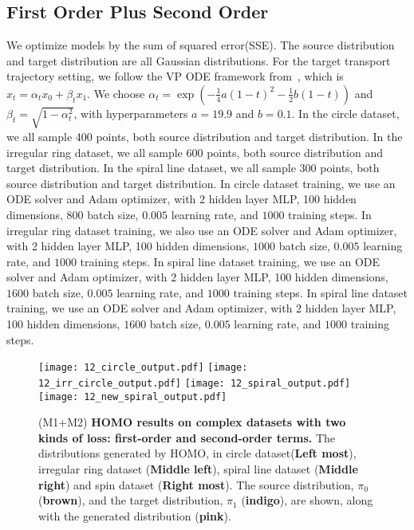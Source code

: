 \subsection{First Order Plus Second Order}\label{sec:app:first_second}
We optimize models by the sum of squared error(SSE). The source distribution and target distribution are all Gaussian distributions. For the target transport trajectory setting, we follow the VP ODE framework from~\cite{rectified_flow}, which is $x_t = \alpha_t x_0 + \beta_t x_1$. We choose $\alpha_t = \exp(-\frac{1}{4} a(1-t)^2 - \frac{1}{2} b(1-t))$ and $\beta_t = \sqrt{1 - \alpha_t^2}$, with hyperparameters $a = 19.9$ and $b = 0.1$. In the circle dataset, we all sample 400 points, both source distribution and target distribution. In the irregular ring dataset, we all sample 600 points, both source distribution and target distribution. In the spiral line dataset, we all sample 300 points, both source distribution and target distribution. In circle dataset training, we use an ODE solver and Adam optimizer, with 2 hidden layer MLP, 100 hidden dimensions, $800$ batch size, $0.005$ learning rate, and $1000$ training steps. In irregular ring dataset training, we also use an ODE solver and Adam optimizer, with 2 hidden layer MLP, 100 hidden dimensions, $1000$ batch size, $0.005$ learning rate, and $1000$ training steps. In spiral line dataset training, we use an ODE solver and Adam optimizer, with 2 hidden layer MLP, 100 hidden dimensions, $1600$ batch size, $0.005$ learning rate, and $1000$ training steps. In spiral line dataset training, we use an ODE solver and Adam optimizer, with 2 hidden layer MLP, 100 hidden dimensions, $1600$ batch size, $0.005$ learning rate, and $1000$ training steps. 
\begin{figure}[!ht]
\centering
\texttt{[image: 12\_circle\_output.pdf]}
\texttt{[image: 12\_irr\_circle\_output.pdf]}
\texttt{[image: 12\_spiral\_output.pdf]}
\texttt{[image: 12\_new\_spiral\_output.pdf]}
\caption{
(M1+M2) \textbf{HOMO results on complex datasets with two kinds of loss: first-order and second-order terms.} The distributions generated by HOMO,
in circle dataset(\textbf{Left most}), irregular ring dataset (\textbf{Middle left}), spiral line dataset (\textbf{Middle right}) and spin dataset (\textbf{Right most}).  
The source distribution, $\pi_0$ ({\textbf{brown}}), and the target distribution, $\pi_1$ ({\textbf{indigo}}), are shown, along with the generated distribution ({\textbf{pink}}). }
\label{fig:m1_m2_appendix}
\end{figure}


